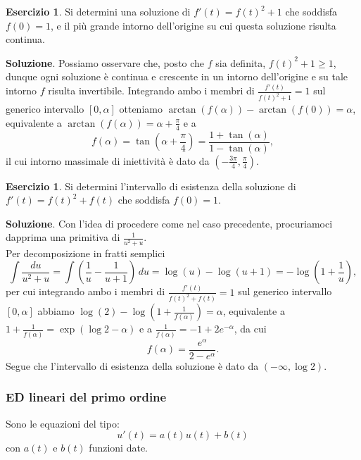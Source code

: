 \documentclass[a4paper,twoside]{article}
\theoremstyle{definition}
\newtheorem{ex}[theorem]{Esercizio}
\numberwithin{theorem}{section}
\begin{document}
\begin{ex} Si determini una soluzione di $f'(t)=f(t)^2+1$ che soddisfa $f(0)=1$, e il più grande intorno dell'origine su cui questa soluzione risulta continua. 
\end{ex}
\textbf{Soluzione}. Possiamo osservare che, posto che $f$ sia definita, $f(t)^2+1\geq 1$, dunque ogni soluzione è continua e crescente in un intorno dell'origine e su tale intorno $f$ risulta invertibile. Integrando ambo i membri di $\frac{f'(t)}{f(t)^2+1}=1$ sul generico intervallo $[0,\alpha]$ otteniamo $\arctan(f(\alpha))-\arctan(f(0))=\alpha$, equivalente a $\arctan(f(\alpha))=\alpha+\frac{\pi}{4}$ e a
$$ f(\alpha)=\tan\left(\alpha+\frac{\pi}{4}\right)=\frac{1+\tan(\alpha)}{1-\tan(\alpha)},$$
il cui intorno massimale di iniettività è dato da $\left(-\frac{3\pi}{4},\frac{\pi}{4}\right)$.

\begin{ex} Si determini l'intervallo di esistenza della soluzione di $f'(t)=f(t)^2+f(t)$ che soddisfa $f(0)=1$. 
\end{ex}
\textbf{Soluzione}. Con l'idea di procedere come nel caso precedente, procuriamoci dapprima una primitiva di $\frac{1}{u^2+u}$.\\ Per decomposizione in fratti semplici 
$$ \int \frac{du}{u^2+u} = \int\left(\frac{1}{u}-\frac{1}{u+1}\right)\,du = \log(u)-\log(u+1) = -\log\left(1+\frac{1}{u}\right), $$
per cui integrando ambo i membri di $\frac{f'(t)}{f(t)^2+f(t)}=1$ sul generico intervallo $[0,\alpha]$ abbiamo $\log(2)-\log\left(1+\frac{1}{f(\alpha)}\right)=\alpha$, equivalente a $1+\frac{1}{f(\alpha)}=\exp\left(\log 2-\alpha\right)$ e a $\frac{1}{f(\alpha)}=-1+2 e^{-\alpha}$, da cui 
$$ f(\alpha) = \frac{e^{\alpha}}{2-e^{\alpha}}. $$
Segue che l'intervallo di esistenza della soluzione è dato da $(-\infty,\log 2)$.

\subsubsection{ED lineari del primo ordine}
Sono le equazioni del tipo: $$u'(t)=a(t)u(t)+b(t)$$
con $a(t)$ e $b(t)$ funzioni date.
\end{document}
